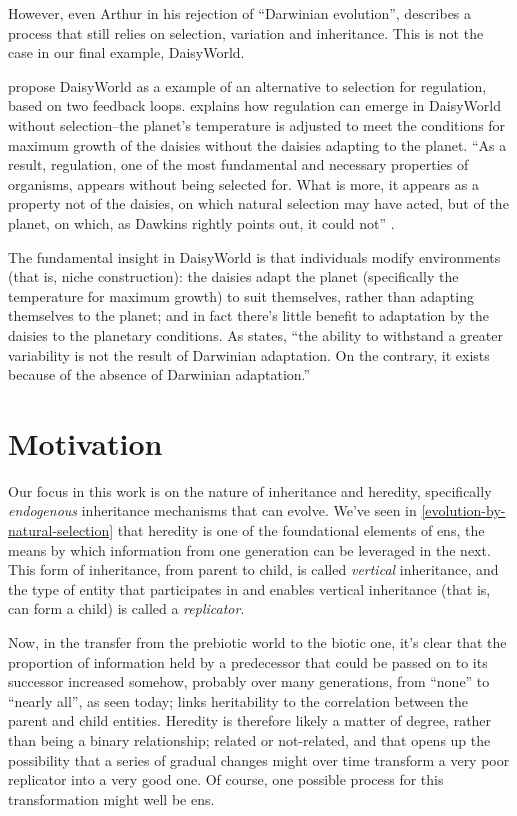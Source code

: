 However, even Arthur in his rejection of ``Darwinian evolution'', describes a process that still relies on selection, variation and inheritance. This is not the case in our final example, DaisyWorld.

\Textcite{LovelockMargulis2011} propose DaisyWorld as a example of an alternative to selection for regulation, based on two feedback loops. \Textcite{Saunders1994} explains how regulation can emerge in DaisyWorld without selection--the planet's temperature is adjusted to meet the conditions for maximum growth of the daisies without the daisies adapting to the planet. ``As a result, regulation, one of the most fundamental and necessary properties of organisms, appears without being selected for. What is more, it appears as a property not of the daisies, on which natural selection may have acted, but of the planet, on which, as Dawkins rightly points out, it could not'' \parencite{Saunders1994}.

The fundamental insight in DaisyWorld is that individuals modify environments (that is, niche construction): the daisies adapt the planet (specifically the temperature for maximum growth) to suit themselves, rather than adapting themselves to the planet; and in fact there's little benefit to adaptation by the daisies to the planetary conditions. As \textcite{Saunders1994} states, ``the ability to withstand a greater variability is not the result of Darwinian adaptation. On the contrary, it exists because of the absence of Darwinian adaptation.''

\section{Motivation}\label{previous-work}

Our focus in this work is on the nature of inheritance and heredity, specifically \emph{endogenous} inheritance mechanisms that can evolve. We’ve seen in \cref{evolution-by-natural-selection} that heredity is one of the foundational elements of \gls{ens}, the means by which information from one generation can be leveraged in the next. This form of inheritance, from parent to child, is called \emph{vertical} inheritance, and the type of entity that participates in and enables vertical inheritance (that is, can form a child) is called a \emph{replicator}. 

Now, in the transfer from the prebiotic world to the biotic one, it’s clear that the proportion of information held by a predecessor that could be passed on to its successor increased somehow, probably over many generations, from ``none'' to ``nearly all'', as seen today; \textcite{Vasas2012a} links heritability to the correlation between the parent and child entities. Heredity is therefore likely a matter of degree, rather than being a binary relationship; related or not-related, and that opens up the possibility that a series of gradual changes might over time transform a very poor replicator into a very good one. Of course, one possible process for this transformation might well be \gls{ens}.


